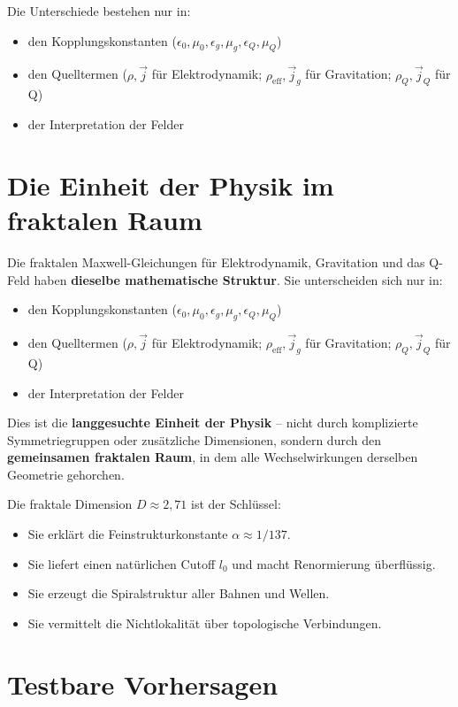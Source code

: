 \documentclass[12pt,a4paper]{article}
\begin{document}
Die Unterschiede bestehen nur in:
\begin{itemize}
    \item den Kopplungskonstanten (\(\epsilon_0, \mu_0, \epsilon_g, \mu_g, \epsilon_Q, \mu_Q\))
    \item den Quelltermen (\(\rho, \vec{j}\) für Elektrodynamik; \(\rho_{\text{eff}}, \vec{j}_g\) für Gravitation; \(\rho_Q, \vec{j}_Q\) für Q)
    \item der Interpretation der Felder
\end{itemize}

\section{Die Einheit der Physik im fraktalen Raum}

Die fraktalen Maxwell-Gleichungen für Elektrodynamik, Gravitation und das Q-Feld haben \textbf{dieselbe mathematische Struktur}. Sie unterscheiden sich nur in:
\begin{itemize}
    \item den Kopplungskonstanten (\(\epsilon_0, \mu_0, \epsilon_g, \mu_g, \epsilon_Q, \mu_Q\))
    \item den Quelltermen (\(\rho, \vec{j}\) für Elektrodynamik; \(\rho_{\text{eff}}, \vec{j}_g\) für Gravitation; \(\rho_Q, \vec{j}_Q\) für Q)
    \item der Interpretation der Felder
\end{itemize}

Dies ist die \textbf{langgesuchte Einheit der Physik} – nicht durch komplizierte Symmetriegruppen oder zusätzliche Dimensionen, sondern durch den \textbf{gemeinsamen fraktalen Raum}, in dem alle Wechselwirkungen derselben Geometrie gehorchen.

Die fraktale Dimension \(D \approx 2,71\) ist der Schlüssel:
\begin{itemize}
    \item Sie erklärt die Feinstrukturkonstante \(\alpha \approx 1/137\).
    \item Sie liefert einen natürlichen Cutoff \(l_0\) und macht Renormierung überflüssig.
    \item Sie erzeugt die Spiralstruktur aller Bahnen und Wellen.
    \item Sie vermittelt die Nichtlokalität über topologische Verbindungen.
\end{itemize}

\section{Testbare Vorhersagen}
\end{document}
